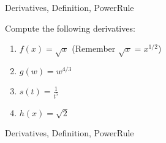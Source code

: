 
\begin{tagblock}{Derivatives, Definition, PowerRule}
\begin{question}
	

\bigskip



Compute the following derivatives:
\begin{enumerate}
\item $f(x) = \sqrt{x}$ (Remember $\sqrt{x} = x^{1/2}$)
\vspace{.7in}

\item $g(w) = w^{4/3}$
\vspace{.7in}

\item $\displaystyle s(t) = \frac{1}{t^5}$
\vspace{.7in}

\item $h(x) = \sqrt{2}$
\end{enumerate}






	
	
\begin{tags}
	    Derivatives, Definition, PowerRule
\end{tags}
	
\begin{diary}
\end{diary}
	
\begin{solution}
	   
\end{solution}
	
\end{question}

\end{tagblock}



